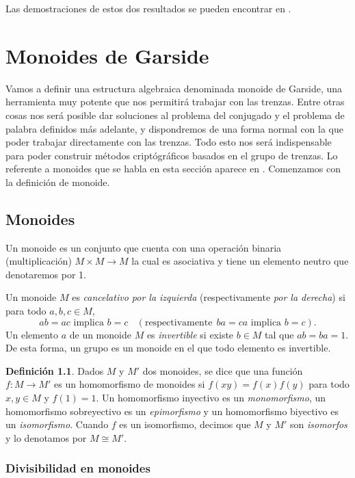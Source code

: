 \documentclass[12pt]{book}
\theoremstyle{definition}
\newtheorem{defi}{Definición}[section]
\begin{document}
Las demostraciones de estos dos resultados se pueden encontrar en \cite{group, alg_abs}.






\chapter{Monoides de Garside}

Vamos a definir una estructura algebraica denominada monoide de Garside, una herramienta muy potente que nos permitirá trabajar con las trenzas. Entre otras cosas nos será posible dar soluciones al problema del conjugado y el problema de palabra definidos más adelante, y dispondremos de una forma normal con la que poder trabajar directamente con las trenzas. Todo esto nos será indispensable para poder construir métodos criptógráficos basados en el grupo de trenzas. Lo referente a monoides que se habla en esta sección aparece en \cite{br_gr}. Comenzamos con la definición de monoide.

\section{Monoides}

Un monoide es un conjunto que cuenta con una operación binaria (multiplicación) $M\times M \rightarrow M$ la cual es asociativa y tiene un elemento neutro que denotaremos por 1. 

Un monoide $M$ es \textit{cancelativo por la izquierda} (respectivamente \textit{por la derecha}) si para todo $a,b,c\in M$,
$$ab=ac\text{ implica } b=c\ \ \ \ (\textrm{respectivamente}\ \  ba=ca \text{ implica } b=c).$$
Un elemento $a$ de un monoide $M$ es \textit{invertible} si existe $b\in M$ tal que $ab=ba=1$. De esta forma, un grupo es un monoide en el que todo elemento es invertible.

\begin{defi}
Dados $M$ y $M'$ dos monoides, se dice que una función $f:M\rightarrow M'$ es un homomorfismo de monoides si $f(xy)=f(x)f(y)$ para todo $x,y\in M$ y $f(1)=1$. Un homomorfismo inyectivo es un \textit{monomorfismo}, un homomorfismo sobreyectivo es un \textit{epimorfismo} y un homomorfismo biyectivo es un \textit{isomorfismo}. Cuando $f$ es un isomorfismo, decimos que $M$ y $M'$ son \textit{isomorfos} y lo denotamos por $M\cong M'$.
\end{defi}



\subsection{Divisibilidad en monoides}
\end{document}
